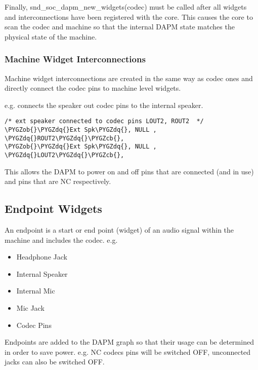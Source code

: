 \documentclass[a4paper,8pt,english]{sphinxmanual}
\def\PYGZob{\char`\{}
\def\PYGZcb{\char`\}}
\def\PYGZdq{\char`\"}
\begin{document}
Finally, snd\_soc\_dapm\_new\_widgets(codec) must be called after all widgets and
interconnections have been registered with the core. This causes the core to
scan the codec and machine so that the internal DAPM state matches the
physical state of the machine.


\subsubsection{Machine Widget Interconnections}
\label{sound/soc/dapm:machine-widget-interconnections}
Machine widget interconnections are created in the same way as codec ones and
directly connect the codec pins to machine level widgets.

e.g. connects the speaker out codec pins to the internal speaker.

\begin{Verbatim}[commandchars=\\\{\}]
/* ext speaker connected to codec pins LOUT2, ROUT2  */
\PYGZob{}\PYGZdq{}Ext Spk\PYGZdq{}, NULL , \PYGZdq{}ROUT2\PYGZdq{}\PYGZcb{},
\PYGZob{}\PYGZdq{}Ext Spk\PYGZdq{}, NULL , \PYGZdq{}LOUT2\PYGZdq{}\PYGZcb{},
\end{Verbatim}

This allows the DAPM to power on and off pins that are connected (and in use)
and pins that are NC respectively.


\subsection{Endpoint Widgets}
\label{sound/soc/dapm:endpoint-widgets}
An endpoint is a start or end point (widget) of an audio signal within the
machine and includes the codec. e.g.
\begin{itemize}
\item {} 
Headphone Jack

\item {} 
Internal Speaker

\item {} 
Internal Mic

\item {} 
Mic Jack

\item {} 
Codec Pins

\end{itemize}

Endpoints are added to the DAPM graph so that their usage can be determined in
order to save power. e.g. NC codecs pins will be switched OFF, unconnected
jacks can also be switched OFF.
\end{document}
